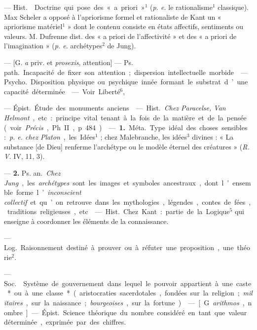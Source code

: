 \begin{itemize}[leftmargin=1cm, label=, itemsep=1pt]
{{ — \si{Hist.}  Doctrine qui
pose des « a priori »$^1$ ({\it p. e.} le rationalisme$^1$ classique). Max Scheler a
opposé à l’apriorisme formel et rationaliste de Kant un « apriorisme
matériel$^1$ » dont le contenu consiste
en états affectifs, sentiments ou
valeurs. M. Dufrenne dist. des « a
priori de l’affectivité » et des « a
priori de l'imagination » ({\it p. e.} archétypes$^2$ de Jung).

 — [G. {\it a} priv. et {\it prosexis}, attention] — \si{Ps. path.} Incapacité de
fixer son attention; dispersion intellectuelle morbide.

 — \si{Psycho.} Disposition physique ou psychique innée formant le
substrat d’une capacité déterminée.

 — Voir Liberté$^6$,

 — \si{Épist.} Étude des monuments anciens.

 — \si{Hist.} {\it Chez Paracelse, Van
Helmont}, etc. : principe vital tenant
à la fois de la matière et de la pensée
(voir {\it Précis}, Ph. II, p. 484).

 — {\bf 1.} \si{Méta.} Type idéal des
choses sensibles : {\it p. e. chez Platon},
les Idées$^1$ ; chez Malebranche, les
idées$^3$ divines : « La substance [de
Dieu] renferme l’archétype ou le
modèle éternel des créatures » ({\it R. V.}
IV, 11, 3).

— {\bf 2.} \si{Ps. an.} {\it Chez Jung}, les {\it archétypes} sont les images et symboles
ancestraux, dont l’ensemble forme
l’{\it inconscient collectif} et qu’on retrouve dans les mythologies,
légendes, contes de fées, traditions religieuses, etc.

 — \si{Hist.} Chez Kant :
partie de la Logique$^5$ qui enseigne à
coordonner les éléments de la connaissance.

 — \si{Log.} Raisonnement destiné à prouver ou à réfuter une
proposition, une théorie$^2$.

 — \si{Soc.}  Système de
gouvernement dans lequel le pouvoir appartient à une caste* ou à une
classe* (aristocraties sacerdotales,
fondées sur la religion; {\it militaires},
sur la naissance ; {\it bourgeoises}, sur la
fortune).

 — [G. {\it arithmos}, nombre]
— \si{Épist.} Science théorique du
nombre considéré en tant que valeur
déterminée, exprimée par des chiffres.

}}
\end{itemize}
